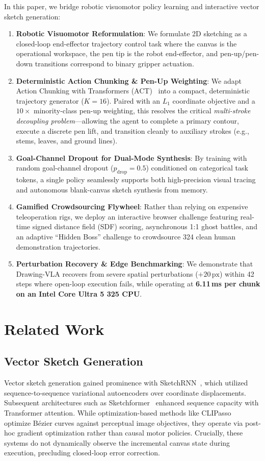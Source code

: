 \documentclass[10pt,twocolumn,letterpaper]{article}
\begin{document}
In this paper, we bridge robotic visuomotor policy learning and interactive vector sketch generation:
\begin{enumerate}
  \item \textbf{Robotic Visuomotor Reformulation}: We formulate 2D sketching as a closed-loop end-effector trajectory control task where the canvas is the operational workspace, the pen tip is the robot end-effector, and pen-up/pen-down transitions correspond to binary gripper actuation.
  \item \textbf{Deterministic Action Chunking \& Pen-Up Weighting}: We adapt Action Chunking with Transformers (ACT)~\cite{zhao2023act} into a compact, deterministic trajectory generator ($K=16$). Paired with an $L_1$ coordinate objective and a $10\times$ minority-class pen-up weighting, this resolves the critical \emph{multi-stroke decoupling problem}---allowing the agent to complete a primary contour, execute a discrete pen lift, and transition cleanly to auxiliary strokes (e.g., stems, leaves, and ground lines).
  \item \textbf{Goal-Channel Dropout for Dual-Mode Synthesis}: By training with random goal-channel dropout ($p_{\text{drop}} = 0.5$) conditioned on categorical task tokens, a single policy seamlessly supports both high-precision visual tracing and autonomous blank-canvas sketch synthesis from memory.
  \item \textbf{Gamified Crowdsourcing Flywheel}: Rather than relying on expensive teleoperation rigs, we deploy an interactive browser challenge featuring real-time signed distance field (SDF) scoring, asynchronous 1:1 ghost battles, and an adaptive ``Hidden Boss'' challenge to crowdsource 324 clean human demonstration trajectories.
  \item \textbf{Perturbation Recovery \& Edge Benchmarking}: We demonstrate that Drawing-VLA recovers from severe spatial perturbations ($+20\,\text{px}$) within 42 steps where open-loop execution fails, while operating at \textbf{6.11\,ms per chunk on an Intel Core Ultra 5 325 CPU}.
\end{enumerate}

\section{Related Work}

\subsection{Vector Sketch Generation}
Vector sketch generation gained prominence with SketchRNN~\cite{ha2017sketchrnn}, which utilized sequence-to-sequence variational autoencoders over coordinate displacements. Subsequent architectures such as Sketchformer~\cite{ribeiro2020sketchformer} enhanced sequence capacity with Transformer attention. While optimization-based methods like CLIPasso~\cite{vinker2022clipasso} optimize B\'ezier curves against perceptual image objectives, they operate via post-hoc gradient optimization rather than causal motor policies. Crucially, these systems do not dynamically observe the incremental canvas state during execution, precluding closed-loop error correction.
\end{document}
